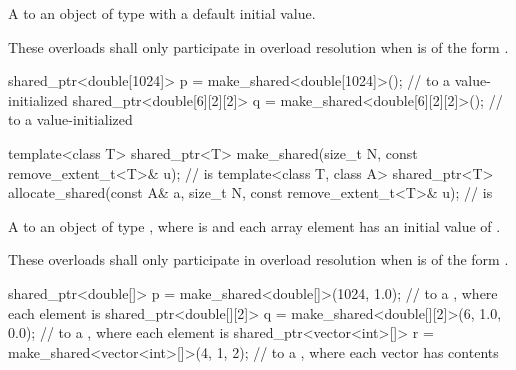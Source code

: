 \begin{itemdescr}
\pnum
\returns A  to an object of type 
with a default initial value.

\pnum
\remarks These overloads shall only participate in overload resolution
when  is of the form .

\pnum
\begin{example}
\begin{codeblock}
shared_ptr<double[1024]> p = make_shared<double[1024]>();
  //  to a value-initialized 
shared_ptr<double[6][2][2]> q = make_shared<double[6][2][2]>();
  //  to a value-initialized 
\end{codeblock}
\end{example}
\end{itemdescr}

%
%
\begin{itemdecl}
template<class T>
  shared_ptr<T> make_shared(size_t N,
                            const remove_extent_t<T>& u);       //  is 
template<class T, class A>
  shared_ptr<T> allocate_shared(const A& a, size_t N,
                                const remove_extent_t<T>& u);   //  is 
\end{itemdecl}

\begin{itemdescr}
\pnum
\returns A  to an object of type ,
where  is  and
each array element has an initial value of .

\pnum
\remarks These overloads shall only participate in overload resolution
when  is of the form .

\pnum
\begin{example}
\begin{codeblock}
shared_ptr<double[]> p = make_shared<double[]>(1024, 1.0);
  //  to a , where each element is 
shared_ptr<double[][2]> q = make_shared<double[][2]>(6, {1.0, 0.0});
  //  to a , where each  element is 
shared_ptr<vector<int>[]> r = make_shared<vector<int>[]>(4, {1, 2});
  //  to a , where each vector has contents 
\end{codeblock}
\end{example}
\end{itemdescr}

